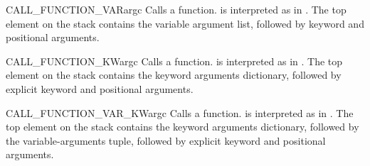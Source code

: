 \begin{opcodedesc}{CALL_FUNCTION_VAR}{argc}
Calls a function.  is interpreted as in .
The top element on the stack contains the variable argument list, followed
by keyword and positional arguments.
\end{opcodedesc}

\begin{opcodedesc}{CALL_FUNCTION_KW}{argc}
Calls a function.  is interpreted as in .
The top element on the stack contains the keyword arguments dictionary, 
followed by explicit keyword and positional arguments.
\end{opcodedesc}

\begin{opcodedesc}{CALL_FUNCTION_VAR_KW}{argc}
Calls a function.  is interpreted as in
.  The top element on the stack contains the
keyword arguments dictionary, followed by the variable-arguments
tuple, followed by explicit keyword and positional arguments.
\end{opcodedesc}
